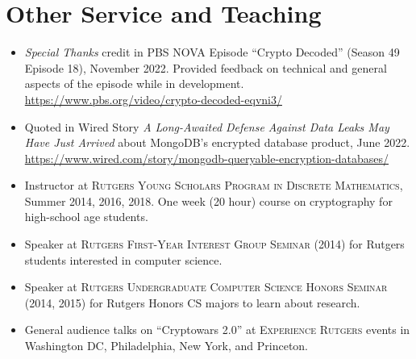 
\section*{Other Service and Teaching}

\begin{itemize}

    \item \emph{Special Thanks} credit in PBS NOVA Episode ``Crypto Decoded''
        (Season 49 Episode 18), November 2022. Provided feedback on technical
        and general aspects of the episode while in development.
        \url{https://www.pbs.org/video/crypto-decoded-eqvni3/}

    \item Quoted in Wired Story \emph{A Long-Awaited Defense Against Data Leaks
        May Have Just Arrived} about MongoDB's encrypted database product, June
        2022.
        \url{https://www.wired.com/story/mongodb-queryable-encryption-databases/}

\item Instructor at \textsc{Rutgers Young Scholars Program in Discrete
    Mathematics}, Summer 2014, 2016, 2018.  One week (20 hour) course on
        cryptography for high-school age students.

\item Speaker at \textsc{Rutgers First-Year Interest Group Seminar} (2014) for
Rutgers students interested in computer science.

\item Speaker at \textsc{Rutgers Undergraduate Computer Science Honors
Seminar} (2014, 2015) for
Rutgers Honors CS majors to learn about research.

\item General audience talks on ``Cryptowars 2.0'' at \textsc{Experience
Rutgers} events in Washington DC, Philadelphia, New York, and Princeton.

\end{itemize}

